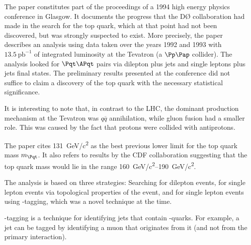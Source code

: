 

\captionsetup{width=0.45\textwidth}




The paper\cite{dzero} constitutes part of the proceedings of a 1994 high energy physics conference in Glasgow.
It documents the progress that the DØ collaboration had made in the search for the top quark, which at that point had not been discovered, but was strongly suspected to exist.
More precisely, the paper describes an analysis using data taken over the years 1992 and 1993 with $\SI{13.5}{\pico\barn}^{-1}$ of integrated luminosity at the Tevatron (a $\Pp\Pap$ collider).
The analysis looked for $\Pqt\APqt$ pairs via dilepton plus jets and single leptons plus jets final states.
The preliminary results presented at the conference did not suffice to claim a discovery of the top quark with the necessary statistical significance.

It is interesting to note that, in contrast to the LHC, the dominant \Pqt\!\!\APqt production mechanism at the Tevatron was $q\overline{q}$ annihilation, while gluon fusion had a smaller role.
This was caused by the fact that protons were collided with antiprotons.

The paper cites \SI{131}{GeV/c^2} as the best previous lower limit for the top quark mass $m_{\Pqt}$.
It also refers to results by the CDF collaboration\cite{cdf} suggesting that the top quark mass would lie in the range \SIrange{160}{190}{GeV/c^2}.

The analysis is based on three strategies: Searching for dilepton events, for single lepton events via topological properties of the event, and for single lepton events using \Pqb-tagging, which was a novel technique at the time.

\Pqb-tagging is a technique for identifying jets that contain \Pqb-quarks.
For example, a jet can be tagged by identifying a muon that originates from it (and not from the primary interaction).


